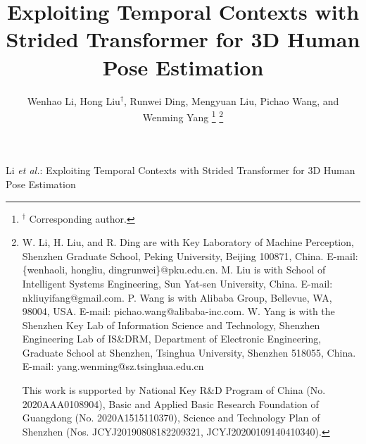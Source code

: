 \documentclass[journal]{IEEEtran}
\begin{document}
\title{Exploiting Temporal Contexts with Strided Transformer for 3D Human Pose Estimation}

\author{
Wenhao Li, Hong Liu$^{\dagger}$, Runwei Ding, Mengyuan Liu, Pichao Wang, and Wenming Yang
\thanks{$^{\dagger}$ Corresponding author.}
\thanks{W. Li, H. Liu, and R. Ding are with Key Laboratory of Machine Perception, Shenzhen Graduate School, Peking University, Beijing 100871, China. 
E-mail: \{wenhaoli, hongliu, dingrunwei\}@pku.edu.cn. 
M. Liu is with School of Intelligent Systems Engineering, Sun Yat-sen University, China. E-mail: nkliuyifang@gmail.com. 
P. Wang is with Alibaba Group, Bellevue, WA, 98004, USA. 
E-mail: pichao.wang@alibaba-inc.com. 
W. Yang is with the Shenzhen Key Lab of Information Science and Technology, Shenzhen Engineering Lab of
IS\&DRM, Department of Electronic Engineering, Graduate School at Shenzhen, Tsinghua University, Shenzhen 518055, China. 
E-mail: yang.wenming@sz.tsinghua.edu.cn

This work is supported by National Key R\&D Program of China (No. 2020AAA0108904), Basic and Applied Basic Research Foundation of Guangdong (No. 2020A1515110370), Science and Technology Plan of Shenzhen (Nos. JCYJ20190808182209321, JCYJ20200109140410340).}
}

\markboth{}
{Li \MakeLowercase{\textit{et al.}}: 
Exploiting Temporal Contexts with Strided Transformer for 3D Human Pose Estimation}

\maketitle
\end{document}
